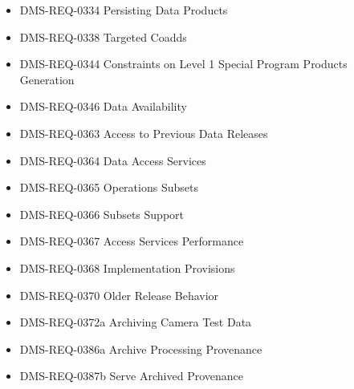 \begin{itemize}
\item DMS-REQ-0334 Persisting Data Products
\item DMS-REQ-0338 Targeted Coadds
\item DMS-REQ-0344 Constraints on Level 1 Special Program Products Generation
\item DMS-REQ-0346 Data Availability
\item DMS-REQ-0363 Access to Previous Data Releases
\item DMS-REQ-0364 Data Access Services
\item DMS-REQ-0365 Operations Subsets
\item DMS-REQ-0366 Subsets Support
\item DMS-REQ-0367 Access Services Performance
\item DMS-REQ-0368 Implementation Provisions
\item DMS-REQ-0370 Older Release Behavior
\item DMS-REQ-0372a Archiving Camera Test Data
\item DMS-REQ-0386a Archive Processing Provenance
\item DMS-REQ-0387b Serve Archived Provenance
\end{itemize}
